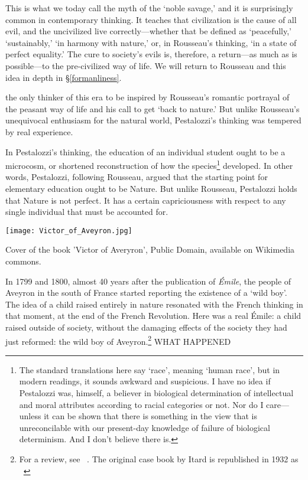 This is what we today call the myth of the `noble savage,' and it is surprisingly common in contemporary thinking. It teaches that civilization is the cause of all evil, and the uncivilized live correctly---whether that be defined as `peacefully,' `sustainably,' `in harmony with nature,' or, in Rousseau's thinking, `in a state of perfect equality.' The cure to society's evils is, therefore, a return---as much as is possible---to the pre-civilized way of life. We will return to Rousseau and this idea in depth in \S\ref{formanliness}.

 the only thinker of this era to be inspired by Rousseau's romantic portrayal of the peasant way of life and his call to get `back to nature.' But unlike Rousseau's unequivocal enthusiasm for the natural world, Pestalozzi's thinking was tempered by real experience.

In Pestalozzi's thinking, the education of an individual student ought to be a microcosm, or shortened reconstruction of how the species\footnote{The standard translations here say `race', meaning `human race', but in modern readings, it sounds awkward and suspicious. I have no idea if Pestalozzi was, himself, a believer in biological determination of intellectual and moral attributes according to racial categories or not. Nor do I care---unless it can be shown that there is something in the view that is unreconcilable with our present-day knowledge of failure of biological determinism. And I don't believe there is.} developed. In other words, Pestalozzi, following Rousseau, argued that the starting point for elementary education ought to be Nature. But unlike Rousseau, Pestalozzi holds that Nature is not perfect. It has a certain capriciousness with respect to any single individual that must be accounted for. 

\begin{marginfigure}\texttt{[image: Victor\_of\_Aveyron.jpg]}\caption{Cover of the book 'Victor of Averyron', Public Domain, available on Wikimedia commons.}\label{fig:aveyron}\end{marginfigure}In 1799 and 1800, almost 40 years after the publication of \emph{Émile}, the people of Aveyron in the south of France started reporting the existence of a `wild boy'. The idea of a child raised entirely in nature resonated with the French thinking in that moment, at the end of the French Revolution. Here was a real Émile: a child raised outside of society, without the damaging effects of the society they had just reformed: the wild boy of Aveyron.\footnote{For a review, see ~\citep{Lane:1979wq}. The original case book by Itard is republished in 1932 as ~\citep{Itard:1932wq}} WHAT HAPPENED 

